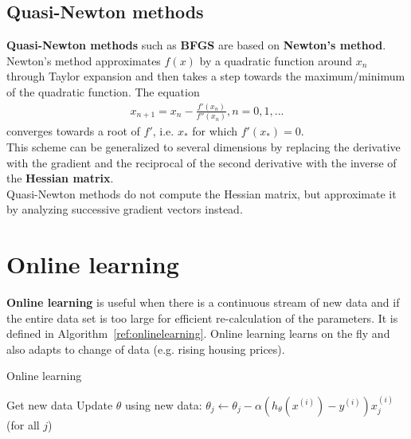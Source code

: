 \documentclass{report}
\begin{document}
\subsection{Quasi-Newton methods}
{\bf Quasi-Newton methods} such as {\bf BFGS} are based on {\bf Newton's method}.
Newton's method approximates $f(x)$ by a quadratic function around $x_n$ through Taylor expansion and then takes a step towards the maximum/minimum of the quadratic function.
The equation
\begin{align*}
x_{n+1} = x_n - \frac{f'(x_n)}{f''(x_n)}, n = 0, 1, ...
\end{align*}
converges towards a root of $f'$, i.e. $x_*$ for which $f'(x_*)=0$. \\
This scheme can be generalized to several dimensions by replacing the derivative with the gradient and the reciprocal of the second derivative with the inverse of the {\bf Hessian matrix}. \\
Quasi-Newton methods do not compute the Hessian matrix, but approximate it by analyzing successive gradient vectors instead.


\section{Online learning}
{\bf Online learning} is useful when there is a continuous stream of new data and if the entire data set is too large for efficient re-calculation of the parameters. It is defined in Algorithm~\ref{ref:onlinelearning}. Online learning learns on the fly and also adapts to change of data (e.g. rising housing prices).

\begin{algorithm}
\caption{Online learning}
\label{ref:onlinelearning}
\begin{algorithmic}
\State Get new data
\Repeat
\State Update $\theta$ using new data: $\theta_j\gets \theta_j - \alpha (h_\theta(x^{(i)})-y^{(i)})x_j^{(i)}$ (for all $j$)
\end{algorithmic}
\end{algorithm}
\end{document}
